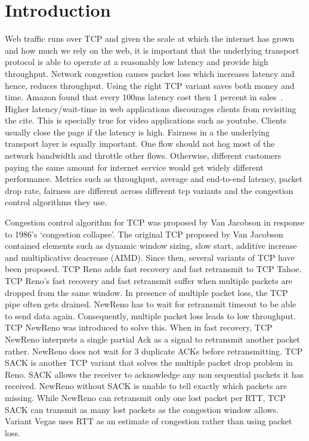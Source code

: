  \section{Introduction}\label{sec:introduction}
 Web traffic runs over TCP and given the scale at which the internet has grown and how much we rely on the web, it is important that the underlying transport protocol is able to operate at a reasonably low latency and provide high throughput. Network congestion causes packet loss which increases latency and hence, reduces throughput. Using the right TCP variant saves both money and time. Amazon found that every 100ms latency cost then 1 percent in sales~\cite{kohavi_online_2007}. Higher latency/wait-time in web applications discourages clients from revisiting the cite. This is specially true for video applications such as youtube. Clients usually close the page if the latency is high. Fairness in a the underlying transport layer is equally important. One flow should not hog most of the network bandwidth and throttle other flows. Otherwise, different customers paying the same amount for internet service would get widely different performance. Metrics such as throughput, average and end-to-end latency, packet drop rate, fairness are different across different tcp variants and the congestion control algorithms they use. 

Congestion control algorithm for TCP was proposed by Van Jacobson  in response to 1986's `congestion collapse'. The original TCP proposed by Van Jacobson contained elements such as dynamic window sizing, slow start, additive increase and multiplicative deacrease (AIMD). Since then, several variants of TCP have been proposed. TCP Reno adds fast recovery and fast retransmit to TCP Tahoe. TCP Reno's fast recovery and fast retransmit suffer when multiple packets are dropped from the same window. In presence of multiple packet loss, the TCP pipe often gets drained. NewReno has to wait for retransmit timeout to be able to send data again. Consequently, multiple packet loss leads to low throughput. TCP NewReno was introduced to solve this. When in fast recovery, TCP NewReno interprets a single partial Ack as a signal to retransmit another packet rather. NewReno does not wait for 3 duplicate ACKs before retransmitting. TCP SACK is another TCP variant that solves the multiple packet drop problem in Reno. SACK allows the receiver to acknowledge any non sequential packets it has received. NewReno  without SACK is unable to tell exactly which packets are missing. While NewReno can retransmit only one lost packet per RTT, TCP SACK can transmit as many lost packets as the congestion window allows. Variant Vegas uses RTT as an estimate of congestion rather than using packet loss.\\

